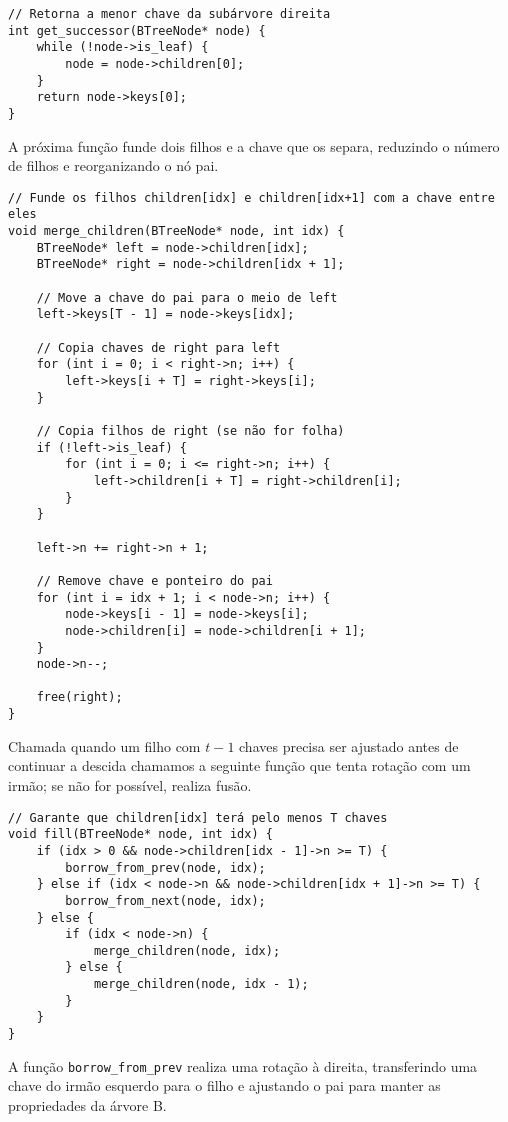 \begin{lstlisting}
// Retorna a menor chave da subárvore direita
int get_successor(BTreeNode* node) {
    while (!node->is_leaf) {
        node = node->children[0];
    }
    return node->keys[0];
}
\end{lstlisting}

A próxima função funde dois filhos e a chave que os separa, reduzindo o número de filhos e reorganizando o nó pai.

\begin{lstlisting}
// Funde os filhos children[idx] e children[idx+1] com a chave entre eles
void merge_children(BTreeNode* node, int idx) {
    BTreeNode* left = node->children[idx];
    BTreeNode* right = node->children[idx + 1];

    // Move a chave do pai para o meio de left
    left->keys[T - 1] = node->keys[idx];

    // Copia chaves de right para left
    for (int i = 0; i < right->n; i++) {
        left->keys[i + T] = right->keys[i];
    }

    // Copia filhos de right (se não for folha)
    if (!left->is_leaf) {
        for (int i = 0; i <= right->n; i++) {
            left->children[i + T] = right->children[i];
        }
    }

    left->n += right->n + 1;

    // Remove chave e ponteiro do pai
    for (int i = idx + 1; i < node->n; i++) {
        node->keys[i - 1] = node->keys[i];
        node->children[i] = node->children[i + 1];
    }
    node->n--;

    free(right);
}
\end{lstlisting}


Chamada quando um filho com $t - 1$ chaves precisa ser ajustado antes de continuar a descida chamamos a seguinte função que tenta rotação com um irmão; se não for possível, realiza fusão.

\begin{lstlisting}
// Garante que children[idx] terá pelo menos T chaves
void fill(BTreeNode* node, int idx) {
    if (idx > 0 && node->children[idx - 1]->n >= T) {
        borrow_from_prev(node, idx);
    } else if (idx < node->n && node->children[idx + 1]->n >= T) {
        borrow_from_next(node, idx);
    } else {
        if (idx < node->n) {
            merge_children(node, idx);
        } else {
            merge_children(node, idx - 1);
        }
    }
}
\end{lstlisting}

A função {\tt borrow\_from\_prev} realiza uma rotação à direita, transferindo uma chave do irmão esquerdo para o filho e ajustando o pai para manter as propriedades da árvore B.

